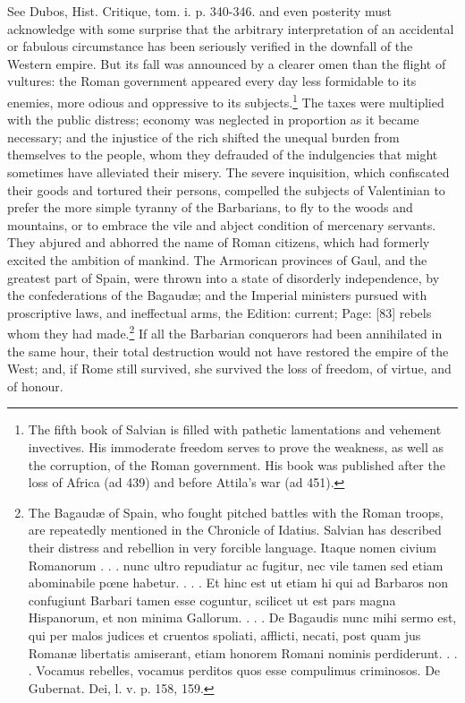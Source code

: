 {See Dubos, Hist. Critique, tom. i. p. 340-346.} and even posterity must acknowledge with some surprise that the arbitrary interpretation of an accidental or fabulous circumstance has been seriously verified in the downfall of the Western empire. But its fall was announced by a clearer omen than the flight of vultures: the Roman government appeared every day less formidable to its enemies, more odious and oppressive to its subjects.\footnote{The fifth book of Salvian is filled with pathetic lamentations and vehement invectives. His immoderate freedom serves to prove the weakness, as well as the corruption, of the Roman government. His book was published after the loss of Africa (ad 439) and before Attila\texthebrew{}’s war (ad 451).} The taxes were multiplied with the public distress; economy was neglected in proportion as it became necessary; and the injustice of the rich shifted the unequal burden from themselves to the people, whom they defrauded of the indulgencies that might sometimes have alleviated their misery. The severe inquisition, which confiscated their goods and tortured their persons, compelled the subjects of Valentinian to prefer the more simple tyranny of the Barbarians, to fly to the woods and mountains, or to embrace the vile and abject condition of mercenary servants. They abjured and abhorred the name of Roman citizens, which had formerly excited the ambition of mankind. The Armorican provinces of Gaul, and the greatest part of Spain, were thrown into a state of disorderly independence, by the confederations of the Bagaudæ; and the Imperial ministers pursued with proscriptive laws, and ineffectual arms, the Edition: current; Page: [83] rebels whom they had made.\footnote{The Bagaudæ of Spain, who fought pitched battles with the Roman troops, are repeatedly mentioned in the Chronicle of Idatius. Salvian has described their distress and rebellion in very forcible language. Itaque nomen civium Romanorum . . . nunc ultro repudiatur ac fugitur, nec vile tamen sed etiam abominabile pœne habetur. . . . Et hinc est ut etiam hi qui ad Barbaros non confugiunt Barbari tamen esse coguntur, scilicet ut est pars magna Hispanorum, et non minima Gallorum. . . . De Bagaudis nunc mihi sermo est, qui per malos judices et cruentos spoliati, afflicti, necati, post quam jus Romanæ libertatis amiserant, etiam honorem Romani nominis perdiderunt. . . . Vocamus rebelles, vocamus perditos quos esse compulimus criminosos. De Gubernat. Dei, l. v. p. 158, 159.} If all the Barbarian conquerors had been annihilated in the same hour, their total destruction would not have restored the empire of the West; and, if Rome still survived, she survived the loss of freedom, of virtue, and of honour.


